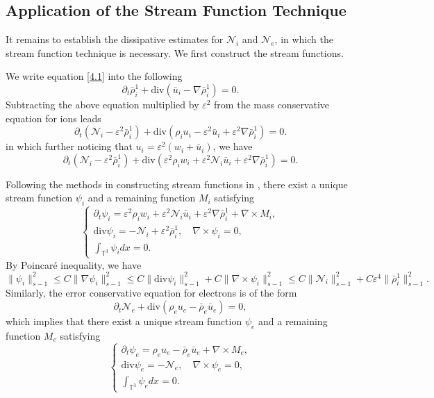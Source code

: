 \documentclass[reqno,twoside,12pt,a4paper]{amsart}
\newcommand{\T}{\mathbb{T}}
\newcommand{\eps}{\mathbb{\varepsilon}}
\newcommand{\dive}{\mathrm{div}}
\newcommand{\pt}{\partial_t}
\newcommand{\D}{\nabla}
\newcommand{\Ni}{\mathcal{N}_i}
\newcommand{\Ne}{\mathcal{N}_e}
\numberwithin{equation}{section}
\begin{document}
\subsection{Application of the Stream Function Technique} It remains to establish the dissipative estimates for $\Ni$ and $\Ne$, in which the stream function technique is necessary. We first construct the stream functions. 

We write equation \eqref{4.1} into the following
\[
\pt \bar{\rho}_i^1+\dive (\bar{u}_i - \nabla \bar{\rho}_i^1)=0.
\]
Subtracting the above equation multiplied by $\eps^2$ from the mass conservative equation for ions leads
\begin{equation*}
    \partial_t(\Ni-\eps^2\bar{\rho}_i^1)+\dive(\rho_i u_i-\eps^2\bar{u}_i + \eps^2 \nabla \bar{\rho}_i^1)=0.
\end{equation*}
in which further noticing that $u_i=\eps^2(w_i+\bar{u}_i)$, we have
\begin{equation*}
    \partial_t(\Ni-\eps^2\bar{\rho}_i^1)+\dive(\eps^2 \rho_i w_i + \eps^2\Ni\bar{u}_i + \eps^2 \nabla \bar{\rho}_i^1)=0.
\end{equation*}

Following the methods in constructing stream functions in \cite{Zhao2021a}, there exist a unique stream function $\psi_i$ and a remaining function $M_i$ satisfying
\begin{equation*}
\begin{cases}
\partial_t \psi_i=\eps^2 \rho_i w_i + \eps^2\Ni\bar{u}_i + \eps^2 \nabla \bar{\rho}_i^1 +\nabla \times M_i,\\
\dive\psi_i=-\Ni + \eps^2 \bar{\rho}_i^1, \quad \nabla \times \psi_i=0,\\
\displaystyle\int_{\T^3} \psi_i dx=0.
\end{cases}
\end{equation*}
By Poincar\'e inequality, we have
\[
\|\psi_i\|_{s-1}^2\leq C\|\D\psi_i\|_{s-1}^2\leq C\|\dive\psi_i\|_{s-1}^2+C\|\D\times \psi_i\|_{s-1}^2\leq C\|\Ni\|_{s-1}^2+C\eps^4\|\bar{\rho}_i^1\|_{s-1}^2.
\]
Similarly, the error conservative equation for electrons is of the form
\[
\pt \Ne+\dive(\rho_eu_e-\bar{\rho}_e\bar{u}_e)=0,
\]
which implies that there exist a unique stream function $\psi_e$ and a remaining function $M_e$ satisfying
\[
\begin{cases}
\pt\psi_e=\rho_e u_e-\bar{\rho}_e\bar{u}_e+\nabla \times M_e,\\
\dive\psi_e=-\mathcal{N}_e,\quad \nabla \times \psi_e=0,\\
\displaystyle\int_{\mathbb{T}^3} \psi_e dx=0.
\end{cases}
\]
\end{document}
